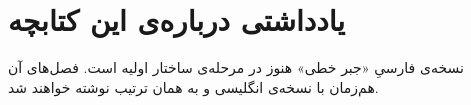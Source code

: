 \chapter*{یادداشتی درباره‌ی این کتابچه}

نسخه‌ی فارسیِ «جبر خطی» هنوز در مرحله‌ی ساختار اولیه است. فصل‌های آن هم‌زمان با نسخه‌ی انگلیسی و به همان ترتیب نوشته خواهند شد.
